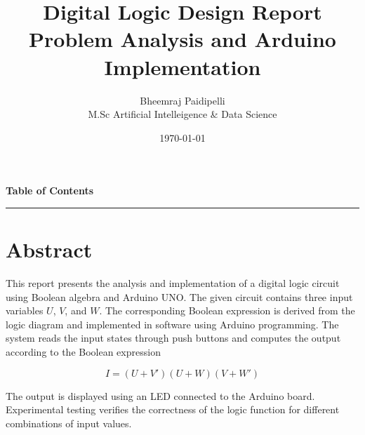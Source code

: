 \documentclass[12pt,a4paper]{article}
\title{
\Huge \textbf{Digital Logic Design Report}\\[0.5cm]
\Large Problem Analysis and Arduino Implementation
}
\author{
Bheemraj Paidipelli\\
[0.5cm]
M.Sc Artificial Intelleigence \& Data Science
}
\date{\today}
\begin{document}
\maketitle
\thispagestyle{empty}

\newpage
\thispagestyle{plain}

\begin{center}
\vspace*{1.5cm}

{\Large\bfseries\color{PrimaryBlue} Table of Contents}

\vspace{0.3cm}
\textcolor{AccentTeal}{\rule{6cm}{1.5pt}}

\end{center}

\vspace{0.8cm}

\tableofcontents

\newpage

\section{Abstract}



\begin{tcolorbox}[
colback=gray!10,
colframe=blue!50!black,
arc=3mm,
boxrule=0.8pt,
top=8mm,
overlay={
\fill[blue!90!black]
(frame.north west) rectangle ([yshift=-6mm]frame.north east);
}
]

This report presents the analysis and implementation of a digital logic circuit
using Boolean algebra and Arduino UNO. The given circuit contains three input
variables $U$, $V$, and $W$. The corresponding Boolean expression is derived
from the logic diagram and implemented in software using Arduino programming.
The system reads the input states through push buttons and computes the output
according to the Boolean expression

\[
I=(U+V')(U+W)(V+W')
\]

The output is displayed using an LED connected to the Arduino board.
Experimental testing verifies the correctness of the logic function for
different combinations of input values.

\end{tcolorbox}
\end{document}
